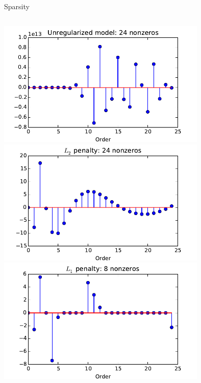 \documentclass[10pt, aspectratio=169]{beamer} %
\newcommand{\leveys}{0.75\textwidth}
\begin{document}
\begin{frame}{Sparsity}
\begin{columns}
\includegraphics[width=\leveys]{unreg_coef.pdf}\\
\includegraphics[width=\leveys]{RR_coef.pdf}\\
\includegraphics[width=\leveys]{lasso_coef.pdf}
\end{columns}
\end{frame}
\end{document}
